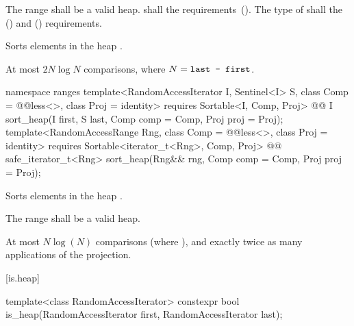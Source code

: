 \begin{itemdescr}
\pnum
\requires The range  shall be a valid heap.
 shall   the
 requirements~(). The type
of  shall   the
 () and
 () requirements.

\pnum
\effects
Sorts elements in the heap
.

\pnum
\complexity
At most $2N \log N$
comparisons, where
$N = \texttt{last - first}$.
\end{itemdescr}

\begin{addedblock}
%
\begin{itemdecl}
namespace ranges {
  template<RandomAccessIterator I, Sentinel<I> S, class Comp = @@less<>,
      class Proj = identity>
    requires Sortable<I, Comp, Proj>
    @@ I
      sort_heap(I first, S last, Comp comp = Comp{}, Proj proj = Proj{});
  template<RandomAccessRange Rng, class Comp = @@less<>, class Proj = identity>
    requires Sortable<iterator_t<Rng>, Comp, Proj>
    @@ safe_iterator_t<Rng>
      sort_heap(Rng&& rng, Comp comp = Comp{}, Proj proj = Proj{});
}
\end{itemdecl}

\begin{itemdescr}
\pnum
\effects
Sorts elements in the heap
.

\pnum
\requires The range  shall be a valid heap.

\pnum
\returns {}

\pnum
\complexity
At most $N \log(N)$
comparisons (where
), and exactly twice as many applications of the projection.
\end{itemdescr}
\end{addedblock}

[is.heap]{}

%
\begin{itemdecl}
template<class RandomAccessIterator>
  constexpr bool is_heap(RandomAccessIterator first, RandomAccessIterator last);
\end{itemdecl}

